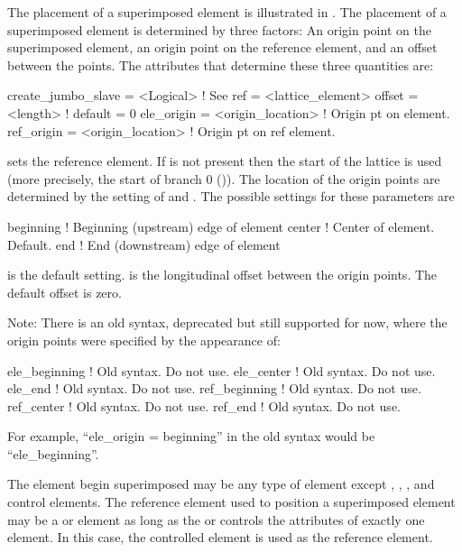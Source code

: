 The placement of a superimposed element is illustrated in
. The placement of a superimposed element is
determined by three factors: An origin point on the superimposed
element, an origin point on the reference element, and an offset between
the points. The attributes that determine these three quantities are:
\begin{example}
  create_jumbo_slave = <Logical>     ! See 
  ref          = <lattice_element>
  offset       = <length>            ! default = 0
  ele_origin   = <origin_location>   ! Origin pt on element.
  ref_origin   = <origin_location>   ! Origin pt on ref element.
\end{example}
 sets the reference element. If  is not present then
the start of the lattice is used (more precisely, the start of branch
0 ()). The location of the origin points are
determined by the setting of  and .  The
possible settings for these parameters are
\begin{example}
  beginning       ! Beginning (upstream) edge of element
  center          ! Center of element. Default.
  end             ! End (downstream) edge of element
\end{example}
 is the default setting.
 is the longitudinal offset
between the origin points. The default offset is zero.

Note: There is an old syntax, deprecated but still supported for now,
where the origin points were specified by the appearance of:
\begin{example}
  ele_beginning         ! Old syntax. Do not use.
  ele_center            ! Old syntax. Do not use.
  ele_end               ! Old syntax. Do not use.
  ref_beginning         ! Old syntax. Do not use.
  ref_center            ! Old syntax. Do not use.
  ref_end               ! Old syntax. Do not use.
\end{example}
For example, ``ele_origin = beginning'' in the old syntax would be ``ele_beginning''.

The element begin superimposed may be any type of element except
, , , and  control
elements. The reference element used to position a superimposed element
may be a  or  element as long as the  or
 controls the attributes of exactly one element. In this case,
the controlled element is used as the reference element.

